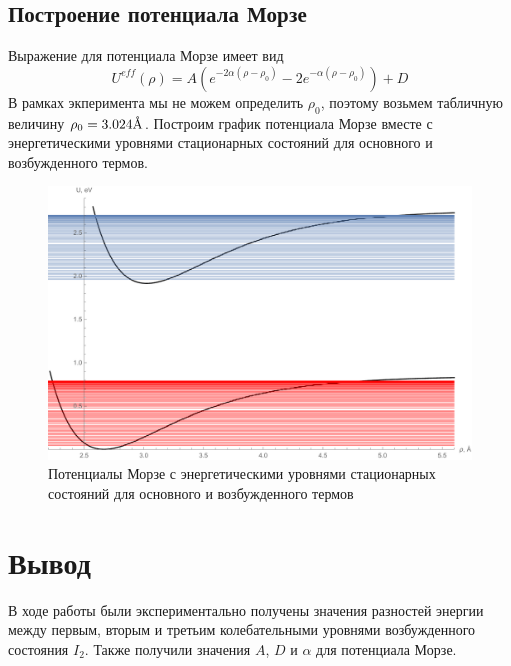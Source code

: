 \documentclass[a4paper, 12pt]{article}
\newcommand{\angstrom}{\textup{\AA}}
\begin{document}
\subsection{Построение потенциала Морзе}
Выражение для потенциала Морзе имеет вид
\begin{equation*}
	U^{eff}(\rho)=A(e^{-2\alpha(\rho-\rho_0)}-2e^{-\alpha(\rho-\rho_0)})+D
\end{equation*}
В рамках экперимента мы не можем определить $\rho_0$, поэтому возьмем табличную величину $\rho_0=3.024\angstrom$. Построим график потенциала Морзе вместе с энергетическими уровнями стационарных состояний для основного и возбужденного термов.
\begin{figure}[!htb]
\centering
\includegraphics[width=\textwidth]{plot10.pdf}
\caption{Потенциалы Морзе с энергетическими уровнями стационарных состояний для основного и возбужденного термов}
\end{figure}
\section{Вывод}
В ходе работы были экспериментально получены значения разностей энергии между первым, вторым и третьим колебательными уровнями возбужденного состояния $I_2$. Также получили значения $A$, $D$ и $\alpha$ для потенциала Морзе.
\end{document}
